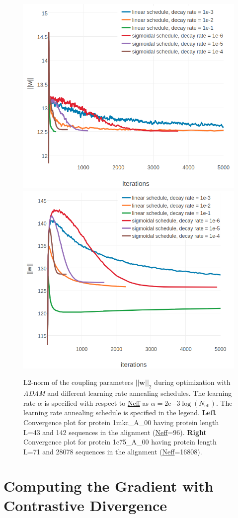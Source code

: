 \documentclass[11pt,a4paper,twoside]{book}
\newcommand{\w}{\mathbf{w}}
\theoremstyle{definition}
\theoremstyle{definition}
\theoremstyle{remark}
\begin{document}
\begin{figure}

{\centering \includegraphics[width=0.5\linewidth]{img/full_likelihood/adam/1mkcA00_decaying_learningrates_parameternorm} \includegraphics[width=0.5\linewidth]{img/full_likelihood/adam/1c75A00_decaying_learningrates_parameternorm} 

}

\caption{L2-norm of the coupling
parameters \(||\w||_2\) during optimization with \emph{ADAM} and
different learning rate annealing schedules. The learning rate
\(\alpha\) is specified with respect to \protect\hyperlink{abrbev}{Neff}
as \(\alpha = 2\mathrm{e}{-3}\log(N_{\text{eff}})\). The learning rate
annealing schedule is specified in the legend. \textbf{Left} Convergence
plot for protein 1mkc\_A\_00 having protein length L=43 and 142
sequences in the alignment (\protect\hyperlink{abbrev}{Neff}=96).
\textbf{Right} Convergence plot for protein 1c75\_A\_00 having protein
length L=71 and 28078 sequences in the alignment
(\protect\hyperlink{abbrev}{Neff}=16808).}\label{fig:adam-learning-rate-annealing}
\end{figure}

\section{Computing the Gradient with Contrastive
Divergence}\label{methods-cd-sampling}
\end{document}
